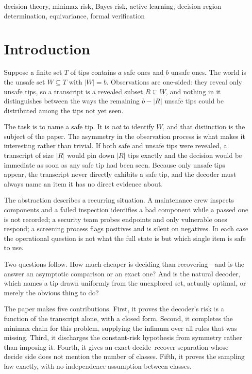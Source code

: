 \documentclass[conference]{IEEEtran}
\theoremstyle{definition}
\begin{document}
\begin{IEEEkeywords}
decision theory, minimax risk, Bayes risk, active learning, decision region determination,
equivariance, formal verification
\end{IEEEkeywords}

\section{Introduction}

Suppose a finite set $T$ of tips contains $a$ safe ones and $b$ unsafe ones. The world is the
unsafe set $W\subseteq T$ with $|W|=b$. Observations are one-sided: they reveal only unsafe
tips, so a transcript is a revealed subset $R\subseteq W$, and nothing in it distinguishes
between the ways the remaining $b-|R|$ unsafe tips could be distributed among the tips not yet
seen.

The task is to name a safe tip. It is \emph{not} to identify $W$, and that distinction is the
subject of the paper. The asymmetry in the observation process is what makes it interesting
rather than trivial. If both safe and unsafe tips were revealed, a transcript of size $|R|$
would pin down $|R|$ tips exactly and the decision would be immediate as soon as any safe tip
had been seen. Because only unsafe tips appear, the transcript never directly exhibits a safe
tip, and the decoder must always name an item it has no direct evidence about.

The abstraction describes a recurring situation. A maintenance crew inspects components and a
failed inspection identifies a bad component while a passed one is not recorded; a security
team probes endpoints and only vulnerable ones respond; a screening process flags positives
and is silent on negatives. In each case the operational question is not what the full state
is but which single item is safe to use.

Two questions follow. How much cheaper is deciding than recovering---and is the answer an
asymptotic comparison or an exact one? And is the natural decoder, which names a tip drawn
uniformly from the unexplored set, actually optimal, or merely the obvious thing to do?

The paper makes five contributions. First, it proves the decoder's risk is a function of the
transcript alone, with a closed form. Second, it completes the minimax chain for this problem,
supplying the infimum over all rules that was missing. Third, it discharges the constant-risk
hypothesis from symmetry rather than imposing it. Fourth, it gives an exact decide--recover
separation whose decide side does not mention the number of classes. Fifth, it proves the
sampling law exactly, with no independence assumption between classes.
\end{document}
